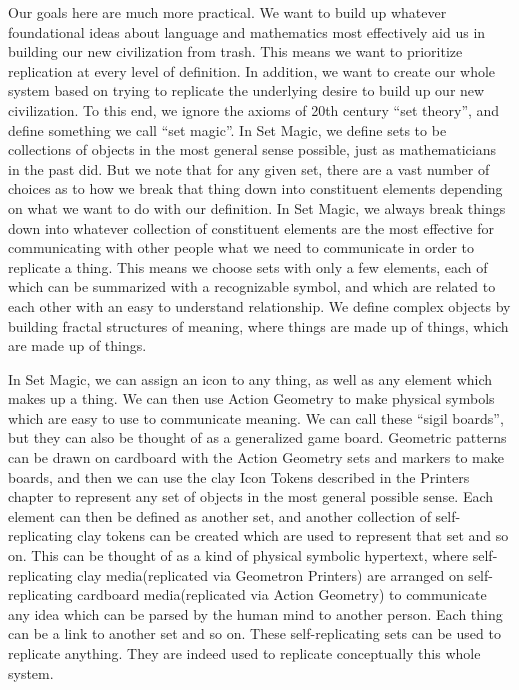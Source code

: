 Our goals here are much more practical.  We want to build up whatever foundational ideas about language and mathematics most effectively aid us in building our new civilization from trash.  This means we want to prioritize replication at every level of definition.  In addition, we want to create our whole system based on trying to replicate the underlying desire to build up our new civilization.  To this end, we ignore the axioms of 20th century ``set theory'', and define something we call ``set magic''.  In Set Magic, we define sets to be collections of objects in the most general sense possible, just as mathematicians in the past did.  But we note that for any given set, there are a vast number of choices as to how we break that thing down into constituent elements depending on what we want to do with our definition.  In Set Magic, we always break things down into whatever collection of constituent elements are the most effective for communicating with other people what we need to communicate in order to replicate a thing.  This means we choose sets with only a few elements, each of which can be summarized with a recognizable symbol, and which are related to each other with an easy to understand relationship.  We define complex objects by building fractal structures of meaning, where things are made up of things, which are made up of things.  

In Set Magic, we can assign an icon to any thing, as well as any element which makes up a thing.  We can then use Action Geometry to make physical symbols which are easy to use to communicate meaning.  We can call these ``sigil boards'', but they can also be thought of as a generalized game board.  Geometric patterns can be drawn on cardboard with the Action Geometry sets and markers to make boards, and then we can use the clay Icon Tokens described in the Printers chapter to represent any set of objects in the most general possible sense.  Each element can then be defined as another set, and another collection of self-replicating clay tokens can be created which are used to represent that set and so on.  This can be thought of as a kind of physical symbolic hypertext, where self-replicating clay media(replicated via Geometron Printers) are arranged on self-replicating cardboard media(replicated via Action Geometry) to communicate any idea which can be parsed by the human mind to another person.  Each thing can be a link to another set and so on.  These self-replicating sets can be used to replicate anything.  They are indeed used to replicate conceptually this whole system.  

